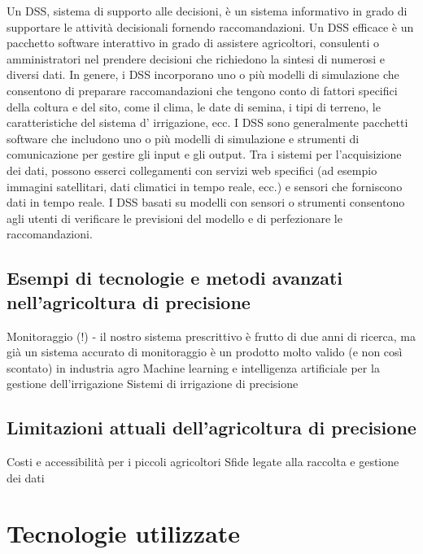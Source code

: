 \documentclass[12pt,a4paper,openright,twoside]{book}
\begin{document}
Un \ac{DSS}, sistema di supporto alle decisioni, è un sistema informativo in grado di supportare le attività decisionali fornendo raccomandazioni. Un \ac{DSS} efficace è un pacchetto software interattivo in grado di assistere agricoltori, consulenti o amministratori nel prendere decisioni che richiedono la sintesi di numerosi e diversi dati. In genere, i DSS incorporano uno o più modelli di simulazione che consentono di preparare raccomandazioni che tengono conto di fattori specifici della coltura e del sito, come il clima, le date di semina, i tipi di terreno, le caratteristiche del sistema d' irrigazione, ecc. I DSS sono generalmente pacchetti software che includono uno o più modelli di simulazione e strumenti di comunicazione per gestire gli input e gli output. Tra i sistemi per l'acquisizione dei dati, possono esserci collegamenti con servizi web specifici (ad esempio immagini satellitari, dati climatici in tempo reale, ecc.) e sensori che forniscono dati in tempo reale. I DSS basati su modelli con sensori o strumenti consentono agli utenti di verificare le previsioni del modello e di perfezionare le raccomandazioni\cite{GALLARDO2020106209}.
\newpage

\section{Esempi di tecnologie e metodi avanzati nell’agricoltura di precisione}
\label{esempi-tecnologie}
Monitoraggio (!) - il nostro sistema prescrittivo è frutto di due anni di ricerca, ma già un sistema accurato di monitoraggio è un prodotto molto valido (e non così scontato) in industria agro
Machine learning e intelligenza artificiale per la gestione dell'irrigazione
Sistemi di irrigazione di precisione

\section{Limitazioni attuali dell’agricoltura di precisione}
\label{limiti}
Costi e accessibilità per i piccoli agricoltori
Sfide legate alla raccolta e gestione dei dati


\chapter{Tecnologie utilizzate}


\end{document}
